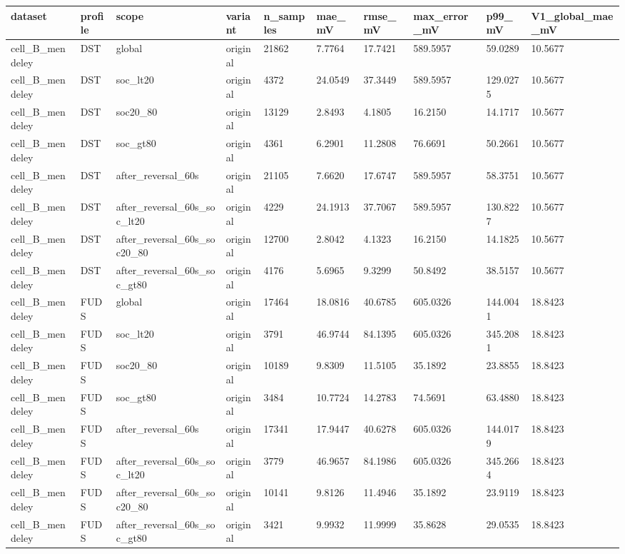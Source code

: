 \begin{tabular}{llllllllll}
\hline
dataset & profile & scope & variant & n\_samples & mae\_mV & rmse\_mV & max\_error\_mV & p99\_mV & V1\_global\_mae\_mV \\
\hline
cell\_B\_mendeley & DST & global & original & 21862 & 7.7764 & 17.7421 & 589.5957 & 59.0289 & 10.5677 \\
cell\_B\_mendeley & DST & soc\_lt20 & original & 4372 & 24.0549 & 37.3449 & 589.5957 & 129.0275 & 10.5677 \\
cell\_B\_mendeley & DST & soc20\_80 & original & 13129 & 2.8493 & 4.1805 & 16.2150 & 14.1717 & 10.5677 \\
cell\_B\_mendeley & DST & soc\_gt80 & original & 4361 & 6.2901 & 11.2808 & 76.6691 & 50.2661 & 10.5677 \\
cell\_B\_mendeley & DST & after\_reversal\_60s & original & 21105 & 7.6620 & 17.6747 & 589.5957 & 58.3751 & 10.5677 \\
cell\_B\_mendeley & DST & after\_reversal\_60s\_soc\_lt20 & original & 4229 & 24.1913 & 37.7067 & 589.5957 & 130.8227 & 10.5677 \\
cell\_B\_mendeley & DST & after\_reversal\_60s\_soc20\_80 & original & 12700 & 2.8042 & 4.1323 & 16.2150 & 14.1825 & 10.5677 \\
cell\_B\_mendeley & DST & after\_reversal\_60s\_soc\_gt80 & original & 4176 & 5.6965 & 9.3299 & 50.8492 & 38.5157 & 10.5677 \\
cell\_B\_mendeley & FUDS & global & original & 17464 & 18.0816 & 40.6785 & 605.0326 & 144.0041 & 18.8423 \\
cell\_B\_mendeley & FUDS & soc\_lt20 & original & 3791 & 46.9744 & 84.1395 & 605.0326 & 345.2081 & 18.8423 \\
cell\_B\_mendeley & FUDS & soc20\_80 & original & 10189 & 9.8309 & 11.5105 & 35.1892 & 23.8855 & 18.8423 \\
cell\_B\_mendeley & FUDS & soc\_gt80 & original & 3484 & 10.7724 & 14.2783 & 74.5691 & 63.4880 & 18.8423 \\
cell\_B\_mendeley & FUDS & after\_reversal\_60s & original & 17341 & 17.9447 & 40.6278 & 605.0326 & 144.0179 & 18.8423 \\
cell\_B\_mendeley & FUDS & after\_reversal\_60s\_soc\_lt20 & original & 3779 & 46.9657 & 84.1986 & 605.0326 & 345.2664 & 18.8423 \\
cell\_B\_mendeley & FUDS & after\_reversal\_60s\_soc20\_80 & original & 10141 & 9.8126 & 11.4946 & 35.1892 & 23.9119 & 18.8423 \\
cell\_B\_mendeley & FUDS & after\_reversal\_60s\_soc\_gt80 & original & 3421 & 9.9932 & 11.9999 & 35.8628 & 29.0535 & 18.8423 \\

\end{tabular}
